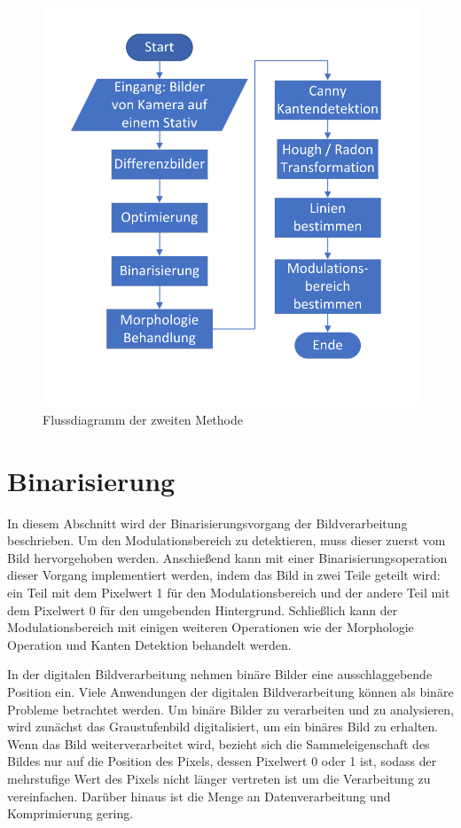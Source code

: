 \begin{figure}[H]
 \centering 
 \includegraphics[keepaspectratio,width=1.0\textwidth]{images/4_ZweiteErfahrung/Flussdiagrammsum.pdf}
 \caption{Flussdiagramm der zweiten Methode}
 \label{fig:Flussdiagramm der zweite Methode}
\end{figure}

\section{Binarisierung}

In diesem Abschnitt wird der Binarisierungsvorgang der Bildverarbeitung beschrieben. Um den Modulationsbereich zu detektieren, muss dieser zuerst vom Bild hervorgehoben werden. Anschießend kann mit einer Binarisierungsoperation dieser Vorgang implementiert werden, indem das Bild in zwei Teile geteilt wird: ein Teil mit dem Pixelwert 1 für den Modulationsbereich und der andere Teil mit dem Pixelwert 0 für den umgebenden Hintergrund. Schließlich kann der Modulationsbereich mit einigen weiteren Operationen wie der Morphologie Operation und Kanten Detektion behandelt werden.

In der digitalen Bildverarbeitung nehmen binäre Bilder eine ausschlaggebende Position ein. Viele Anwendungen der digitalen Bildverarbeitung können als binäre Probleme betrachtet werden. Um binäre Bilder zu verarbeiten und zu analysieren, wird zunächst das Graustufenbild digitalisiert, um ein binäres Bild zu erhalten. Wenn das Bild weiterverarbeitet wird, bezieht sich die Sammeleigenschaft des Bildes nur auf die Position des Pixels, dessen Pixelwert 0 oder 1 ist, sodass der mehrstufige Wert des Pixels nicht länger vertreten ist um die Verarbeitung zu vereinfachen. Darüber hinaus ist die Menge an Datenverarbeitung und Komprimierung gering. 

